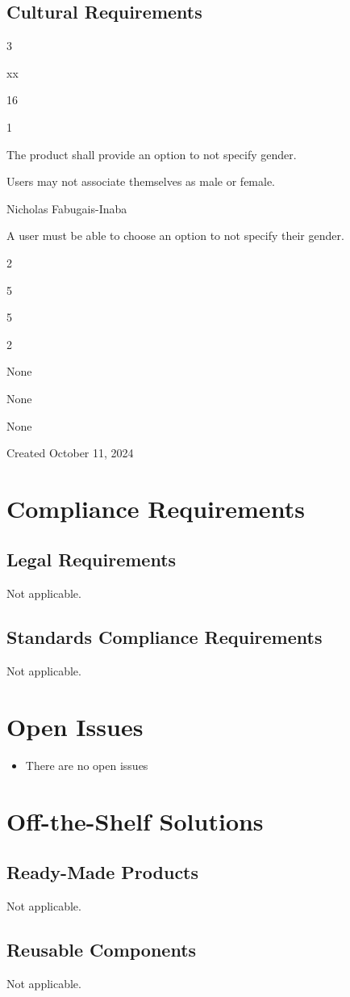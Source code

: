 \documentclass[12pt]{article}
\newenvironment{myreq}[1]{%
\setlist[description]{font=\normalfont\color{darkgray}}%
\begin{tcolorbox}[colframe=black,colback=white, sharp corners, boxrule=1pt]%
\bfseries\color{blue}%
\begin{description}#1}%
{\end{description}\end{tcolorbox}}
\newcommand{\threeinline}[3]{\begin{multicols}{3}#1 #2 #3\end{multicols}}
\newcommand{\twoinline}[2]{\begin{multicols}{2}#1 #2\end{multicols}}
\newcommand{\reqno}{\item[Requirement \#:]}
\newcommand{\reqtype}{\item[Requirement Type:]}
\newcommand{\reqevent}{\item[Event/BUC/PUC \#:]}
\newcommand{\reqdesc}{\item[Description:]}
\newcommand{\reqrat}{\item[Rationale:]}
\newcommand{\reqorig}{\item[Originator:]}
\newcommand{\reqfit}{\item[Fit Criterion:]}
\newcommand{\reqsatis}{\item[Customer Satisfaction:]}
\newcommand{\reqdissat}{\item[Customer Dissatisfaction:]}
\newcommand{\reqdep}{\item[Dependencies:]}
\newcommand{\reqconf}{\item[Conflicts:]}
\newcommand{\reqmater}{\item[Materials:]}
\newcommand{\reqhist}{\item[History:]}
\begin{document}
\subsection{Cultural Requirements}

\begin{myreq}
  \threeinline
    {\reqno xx}
    {\reqtype 16}
    {\reqevent 1}
  \reqdesc The product shall provide an option to not specify gender.
  \reqrat Users may not associate themselves as male or female.
  \reqorig Nicholas Fabugais-Inaba
  \reqfit A user must be able to choose an option to not specify their
  gender.
  \twoinline
    {\reqsatis 5}
    {\reqdissat 5}
  \twoinline
  {\reqdep None}
  {\reqconf None}
  \reqmater None
  \reqhist Created October 11, 2024 
\end{myreq}

\section{Compliance Requirements}
\subsection{Legal Requirements}
Not applicable.
\subsection{Standards Compliance Requirements}
Not applicable.

\section{Open Issues}

\begin{itemize}

  \item There are no open issues

\end{itemize}

\section{Off-the-Shelf Solutions}
\subsection{Ready-Made Products}
Not applicable.
\subsection{Reusable Components}
Not applicable.
\end{document}

